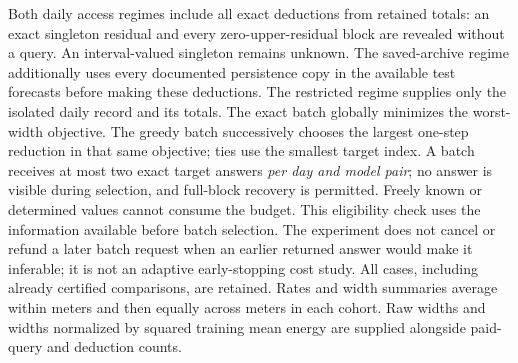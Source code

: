 \documentclass[12pt]{article}
\begin{document}
Both daily access regimes include all exact deductions from retained
totals: an exact singleton residual and every zero-upper-residual block
are revealed without a query. An interval-valued singleton remains unknown.
The saved-archive regime additionally uses every documented persistence
copy in the available test forecasts before making these deductions.
The restricted regime supplies only the isolated daily record and its totals.
The exact batch globally minimizes the worst-width objective. The greedy
batch successively chooses the largest one-step reduction in that same
objective; ties use the smallest target index. A batch receives at
most two exact target answers \emph{per day and model pair}; no answer is
visible during selection, and full-block recovery is permitted.
Freely known or determined values cannot consume the budget.
This eligibility check uses the information available before batch selection.
The experiment does not cancel or refund a later batch request when an
earlier returned answer would make it inferable; it is not an adaptive
early-stopping cost study.
All cases, including already certified comparisons, are retained.
Rates and width summaries average within meters and then equally across
meters in each cohort. Raw widths and widths normalized by squared training
mean energy are supplied alongside paid-query and deduction counts.
\end{document}

